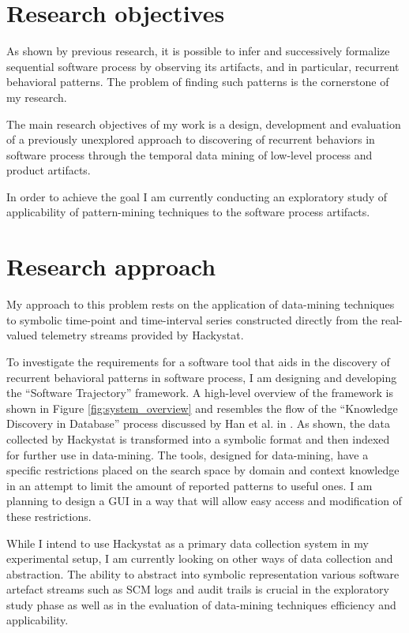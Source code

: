 \documentclass{sig-alternate}
\begin{document}
\section{Research objectives}
As shown by previous research, it is possible to infer and successively formalize sequential software process by observing its artifacts, and in particular, recurrent behavioral patterns. The problem of finding such patterns is the cornerstone of my research. 

The main research objectives of my work is a design, development and evaluation of a previously unexplored approach to discovering of recurrent behaviors in software process through the temporal data mining of low-level process and product artifacts.

In order to achieve the goal I am currently conducting an exploratory study of applicability of pattern-mining techniques to the software process artifacts.

\section{Research approach}
My approach to this problem rests on the application of data-mining techniques to symbolic time-point and time-interval series constructed directly from the real-valued telemetry streams provided by Hackystat.

To investigate the requirements for a software tool that aids in the discovery of recurrent behavioral patterns in software process, I am designing and developing the ``Software Trajectory'' framework. A high-level overview of the framework is shown in Figure \ref{fig:system_overview} and resembles the flow of the ``Knowledge Discovery in Database'' process discussed by Han et al. in \cite{citeulike:709476}. As shown, the data collected by Hackystat is transformed into a symbolic format and then indexed for further use in data-mining. The tools, designed for data-mining, have a specific restrictions placed on the search space by domain and context knowledge in an attempt to limit the amount of reported patterns to useful ones. I am planning to design a GUI in a way that will allow easy access and modification of these restrictions. 

While I intend to use Hackystat as a primary data collection system in my experimental setup, I am currently looking on other ways of data collection and abstraction. The ability to abstract into symbolic representation various software artefact streams such as SCM logs and audit trails is crucial in the exploratory study phase as well as in the evaluation of data-mining techniques efficiency and applicability. 
\end{document}
